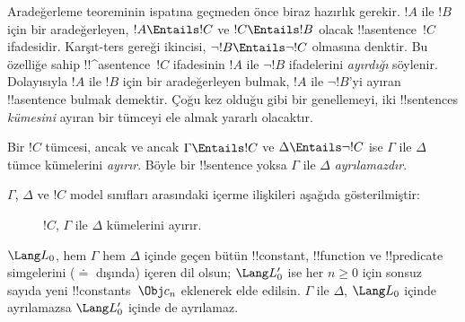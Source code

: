 \documentclass[../../../include/open-logic-section]{subfiles}
\begin{document}


Aradeğerleme teoreminin ispatına geçmeden önce biraz hazırlık gerekir.
$!A$ ile $!B$ için bir aradeğerleyen, $!A\Entails !C$ ve
$!C\Entails !B$ olacak !!a{sentence}~$!C$ ifadesidir. Karşıt-ters
gereği ikincisi, $\lnot !B\Entails\lnot !C$ olmasına denktir. Bu
özelliğe sahip !!^a{sentence}~$!C$ ifadesinin $!A$ ile $\lnot !B$
ifadelerini \emph{ayırdığı} söylenir. Dolayısıyla $!A$ ile $!B$ için
bir aradeğerleyen bulmak, $!A$ ile $\lnot !B$'yi ayıran !!a{sentence}
bulmak demektir. Çoğu kez olduğu gibi bir genellemeyi, iki
!!{sentence}s \emph{kümesini} ayıran bir tümceyi ele almak yararlı
olacaktır.

\begin{defn}
Bir $!C$ tümcesi, ancak ve ancak $\Gamma\Entails !C$ ve
$\Delta\Entails\lnot !C$ ise $\Gamma$ ile $\Delta$ tümce kümelerini
\emph{ayırır}. Böyle bir !!{sentence} yoksa $\Gamma$ ile $\Delta$
\emph{ayrılamazdır}.
\end{defn}

$\Gamma$, $\Delta$ ve $!C$ model sınıfları arasındaki içerme ilişkileri
aşağıda gösterilmiştir:
\begin{figure}[h]
  \centering
  \caption{$!C$, $\Gamma$ ile $\Delta$ kümelerini ayırır.}
\end{figure}

\begin{lem}
$\Lang L_0$, hem $\Gamma$ hem $\Delta$ içinde geçen bütün
!!{constant}, !!{function} ve !!{predicate} simgelerini ($\doteq$
dışında) içeren dil olsun; $\Lang L'_0$ ise her $n\geq0$ için sonsuz
sayıda yeni !!{constant}s~$\Obj c_n$ eklenerek elde edilsin. $\Gamma$
ile $\Delta$, $\Lang L_0$ içinde ayrılamazsa $\Lang L'_0$ içinde de
ayrılamaz.
\end{lem}
\end{document}
